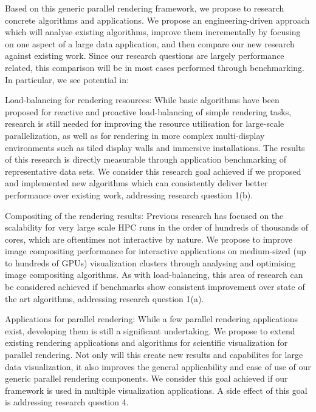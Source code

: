  Based on this generic parallel rendering framework, we propose to research
 concrete algorithms and applications. We propose an engineering-driven approach
 which will analyse existing algorithms, improve them incrementally by focusing
 on one aspect of a large data application, and then compare our new research
 against existing work. Since our research questions are largely performance
 related, this comparison will be in most cases performed through benchmarking.
 In particular, we see potential in:
 \begin{compactdesc}
  \item [Load-balancing for rendering resources:] While basic algorithms have been
  proposed for reactive and proactive load-balancing of simple rendering tasks,
  research is still needed for improving the resource utilisation for large-scale
  parallelization, as well as for rendering in more complex multi-display
  environments such as tiled display walls and immersive installations. The
  results of this research is directly measurable through application benchmarking
  of representative data sets. We consider this research goal achieved if we
  proposed and implemented new algorithms which can consistently deliver better
  performance over existing work, addressing research question 1(b).
  \item [Compositing of the rendering results:] Previous research has focused on
  the scalability for very large scale HPC runs in the order of hundreds of
  thousands of cores, which are oftentimes not interactive by nature. We propose
  to improve image compositing performance for interactive applications on
  medium-sized (up to hundreds of GPUs) visualization clusters through analysing
  and optimising image compositing algorithms. As with load-balancing, this area
  of research can be considered achieved if benchmarks show consistent improvement
  over state of the art algorithms, addressing research question 1(a).
  \item [Applications for parallel rendering:] While a few parallel rendering
  applications exist, developing them is still a significant undertaking. We
  propose to extend existing rendering applications and algorithms for scientific
  visualization for parallel rendering. Not only will this create new results and
  capabilites for large data visualization, it also improves the general
  applicability and ease of use of our generic parallel rendering components. We
  consider this goal achieved if our framework is used in multiple visualization
  applications. A side effect of this goal is addressing research question 4.

\end{compactdesc}
